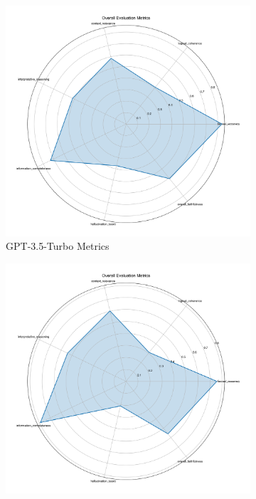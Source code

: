 \begin{figure}[!htbp]
\centering
\begin{subfigure}[b]{0.32\textwidth}
    \centering
    \includegraphics[width=\textwidth]{figures/overall/overall_metrics_radar_gpt-3.5-turbo.png}
    \caption{GPT-3.5-Turbo Metrics}
    \label{fig:overall_metrics_radar_gpt35}
\end{subfigure}
\hfill
\begin{subfigure}[b]{0.32\textwidth}
    \centering
    \includegraphics[width=\textwidth]{figures/overall/overall_metrics_radar_gpt-4-turbo.png}

\end{subfigure}
\end{figure}
